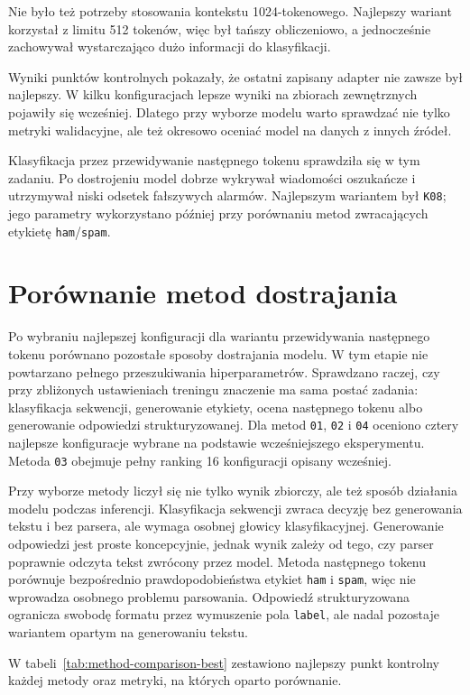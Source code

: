 Nie było też potrzeby stosowania kontekstu 1024-tokenowego. Najlepszy wariant
korzystał z limitu 512 tokenów, więc był tańszy obliczeniowo, a jednocześnie
zachowywał wystarczająco dużo informacji do klasyfikacji.

Wyniki punktów kontrolnych pokazały, że ostatni zapisany adapter nie zawsze był
najlepszy. W kilku konfiguracjach lepsze wyniki na zbiorach zewnętrznych
pojawiły się wcześniej. Dlatego przy wyborze modelu warto sprawdzać nie tylko
metryki walidacyjne, ale też okresowo oceniać model na danych z innych źródeł.

Klasyfikacja przez przewidywanie następnego tokenu sprawdziła się w tym zadaniu.
Po dostrojeniu model dobrze wykrywał wiadomości oszukańcze i utrzymywał niski
odsetek fałszywych alarmów. Najlepszym wariantem był \texttt{K08}; jego
parametry wykorzystano później przy porównaniu metod zwracających etykietę
\texttt{ham}/\texttt{spam}.

\section{Porównanie metod dostrajania}

Po wybraniu najlepszej konfiguracji dla wariantu przewidywania następnego
tokenu porównano pozostałe sposoby dostrajania modelu. W tym etapie nie
powtarzano pełnego przeszukiwania hiperparametrów. Sprawdzano raczej, czy przy
zbliżonych ustawieniach treningu znaczenie ma sama postać zadania:
klasyfikacja sekwencji, generowanie etykiety, ocena następnego tokenu albo
generowanie odpowiedzi strukturyzowanej. Dla metod \texttt{01}, \texttt{02}
i \texttt{04} oceniono cztery najlepsze konfiguracje wybrane na podstawie
wcześniejszego eksperymentu. Metoda \texttt{03} obejmuje pełny ranking 16
konfiguracji opisany wcześniej.

Przy wyborze metody liczył się nie tylko wynik zbiorczy, ale też sposób
działania modelu podczas inferencji. Klasyfikacja sekwencji zwraca decyzję bez
generowania tekstu i bez parsera, ale wymaga osobnej głowicy klasyfikacyjnej.
Generowanie odpowiedzi jest proste koncepcyjnie, jednak wynik zależy od tego,
czy parser poprawnie odczyta tekst zwrócony przez model. Metoda następnego
tokenu porównuje bezpośrednio prawdopodobieństwa etykiet \texttt{ham} i
\texttt{spam}, więc nie wprowadza osobnego problemu parsowania. Odpowiedź
strukturyzowana ogranicza swobodę formatu przez wymuszenie pola \texttt{label},
ale nadal pozostaje wariantem opartym na generowaniu tekstu.

W tabeli~\ref{tab:method-comparison-best} zestawiono najlepszy punkt kontrolny
każdej metody oraz metryki, na których oparto porównanie.

